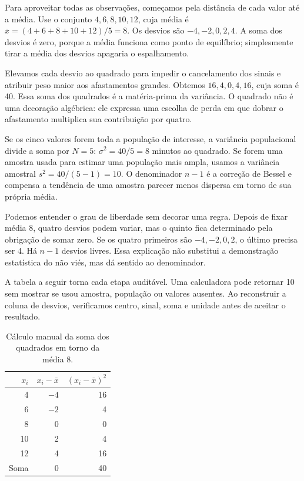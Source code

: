 Para aproveitar todas as observações, começamos pela distância de cada valor até a média. Use o conjunto $4,6,8,10,12$, cuja média é $\bar{x}=(4+6+8+10+12)/5=8$. Os desvios são $-4,-2,0,2,4$. A soma dos desvios é zero, porque a média funciona como ponto de equilíbrio; simplesmente tirar a média dos desvios apagaria o espalhamento.

Elevamos cada desvio ao quadrado para impedir o cancelamento dos sinais e atribuir peso maior aos afastamentos grandes. Obtemos $16,4,0,4,16$, cuja soma é 40. Essa soma dos quadrados é a matéria-prima da variância. O quadrado não é uma decoração algébrica: ele expressa uma escolha de perda em que dobrar o afastamento multiplica sua contribuição por quatro.

Se os cinco valores forem toda a população de interesse, a variância populacional divide a soma por $N=5$: $\sigma^2=40/5=8$ minutos ao quadrado. Se forem uma amostra usada para estimar uma população mais ampla, usamos a variância amostral $s^2=40/(5-1)=10$. O denominador $n-1$ é a correção de Bessel e compensa a tendência de uma amostra parecer menos dispersa em torno de sua própria média.

Podemos entender o grau de liberdade sem decorar uma regra. Depois de fixar média 8, quatro desvios podem variar, mas o quinto fica determinado pela obrigação de somar zero. Se os quatro primeiros são $-4,-2,0,2$, o último precisa ser 4. Há $n-1$ desvios livres. Essa explicação não substitui a demonstração estatística do não viés, mas dá sentido ao denominador.

A tabela a seguir torna cada etapa auditável. Uma calculadora pode retornar 10 sem mostrar se usou amostra, população ou valores ausentes. Ao reconstruir a coluna de desvios, verificamos centro, sinal, soma e unidade antes de aceitar o resultado.

\begin{table}[htbp]
\centering
\small
\caption{Cálculo manual da soma dos quadrados em torno da média 8.}
\label{tab:variancia-mao}
\begin{tabular}{@{}rrr@{}}
\toprule
$x_i$ & $x_i-\bar{x}$ & $(x_i-\bar{x})^2$ \\
\midrule
4 & $-4$ & 16 \\
6 & $-2$ & 4 \\
8 & 0 & 0 \\
10 & 2 & 4 \\
12 & 4 & 16 \\
\midrule
Soma & 0 & 40 \\
\bottomrule
\end{tabular}
\end{table}

